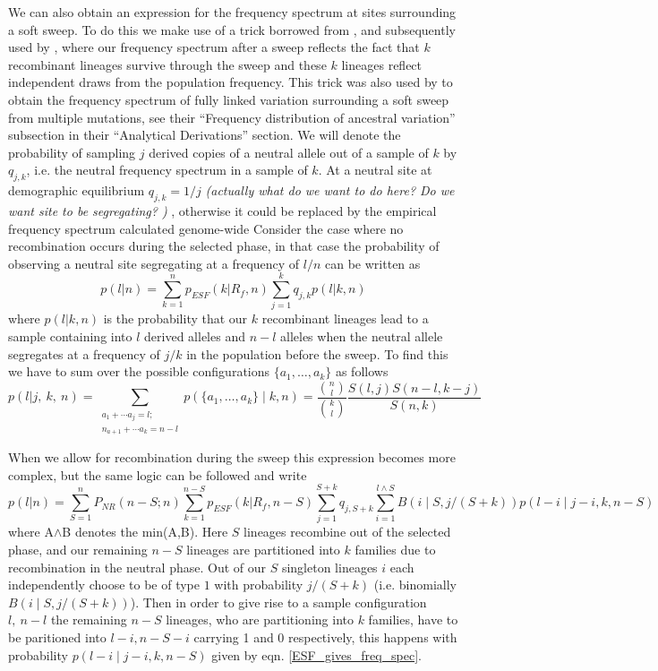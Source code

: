 \documentclass[a4paper,10pt]{article}
\newcommand{\gc}[1]{{\it \color{red} (#1)} }
\begin{document}
We can also obtain an expression for the frequency spectrum at sites surrounding a soft sweep. To do this we make use of a trick borrowed from \cite{Kimandstephan}, and subsequently used by \cite{NielsenKimetc}, where our frequency spectrum after a sweep reflects the fact that $k$ recombinant lineages survive through the sweep and these $k$ lineages reflect independent draws from the population frequency. This trick was also used by \citep{PenningandHermisson} to obtain the frequency spectrum of fully linked variation surrounding a soft sweep from multiple mutations, see their ``Frequency distribution of ancestral variation'' subsection in their ``Analytical Derivations'' section. We will denote the probability of sampling $j$ derived copies of a neutral allele out of a sample of $k$ by $q_{j,k}$, i.e. the neutral frequency spectrum in a sample of $k$. At a neutral site at demographic equilibrium $q_{j,k} = 1/j$ \gc{actually what do we want to do here? Do we want site to be segregating? }, otherwise it could be replaced by the empirical frequency spectrum calculated genome-wide \citep[as in ][]{NielsenKimetc}
Consider the case where no recombination occurs during the selected phase, in that case the probability of observing a neutral site segregating at a frequency of $l/n$ can be written as
\begin{equation}
p(l | n) =  \sum_{k=1}^{n}  p_{ESF}(k | R_f,n)  \sum_{j=1}^{k} q_{j,k}  p(l | k,n) 
\end{equation}
where $  p(l | k,n) $ is the probability that our $k$ recombinant lineages lead to a sample containing into $l$ derived alleles and $n-l$ alleles when the neutral allele segregates at a frequency of $j/k$ in the population before the sweep. To find this we have to sum over the possible configurations $\{a_1,\dots,a_k\}$ as follows
\begin{equation}
p(l | j, ~k,~n) = 
\sum_{\substack{a_1+\cdots a_j=l;\\
    n_{a+1}+\cdots a_k=n-l}} 
p(\{a_1,\dots,a_k\} \mid k, n) = \frac{ {n \choose l} }{ {k \choose l} }\frac{ S(l,j)  S(n-l,k-j)  }{ S(n,k) } \label{ESF_gives_freq_spec}
\end{equation}

When we allow for recombination during the sweep this expression becomes more complex, but the same logic can be followed and write
\begin{equation}
p(l | n) = \sum_{S=1}^n P_{NR}(n-S; n) \sum_{k=1}^{n-S} p_{ESF}(k | R_f,n-S) \sum_{j=1}^{S+k} q_{j,S+k}
\sum_{i=1}^{l \wedge S} B(i \mid S,j/(S+k)) p(l-i \mid j-i,k,n-S )
\end{equation}
where A$\wedge$B denotes the min(A,B). Here $S$ lineages recombine out of the selected phase, and our remaining $n-S$ lineages are partitioned into $k$ families due to recombination in the neutral phase. Out of our $S$ singleton lineages $i$ each independently choose to be of type $1$ with probability $j/(S+k)$ (i.e. binomially $ B(i \mid S,j/(S+k))$). Then in order to give rise to a sample configuration $l,~n-l$ the remaining $n-S$ lineages, who are partitioning into $k$ families, have to be paritioned into $l-i,n-S-i$ carrying 1 and 0 respectively, this happens with probability $p(l-i \mid j-i,k,n-S )$ given by eqn. \eqref{ESF_gives_freq_spec}.   
\end{document}
